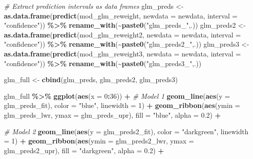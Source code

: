 \documentclass[
]{article}
\newenvironment{Shaded}{\begin{snugshade}}{\end{snugshade}}
\newcommand{\AttributeTok}[1]{\textcolor[rgb]{0.13,0.29,0.53}{#1}}
\newcommand{\CommentTok}[1]{\textcolor[rgb]{0.56,0.35,0.01}{\textit{#1}}}
\newcommand{\DecValTok}[1]{\textcolor[rgb]{0.00,0.00,0.81}{#1}}
\newcommand{\FloatTok}[1]{\textcolor[rgb]{0.00,0.00,0.81}{#1}}
\newcommand{\FunctionTok}[1]{\textcolor[rgb]{0.13,0.29,0.53}{\textbf{#1}}}
\newcommand{\NormalTok}[1]{#1}
\newcommand{\OtherTok}[1]{\textcolor[rgb]{0.56,0.35,0.01}{#1}}
\newcommand{\SpecialCharTok}[1]{\textcolor[rgb]{0.81,0.36,0.00}{\textbf{#1}}}
\newcommand{\StringTok}[1]{\textcolor[rgb]{0.31,0.60,0.02}{#1}}
\begin{document}
\begin{Shaded}
\begin{Highlighting}[]
\CommentTok{\# Extract prediction intervals as data frames}
\NormalTok{glm\_preds  }\OtherTok{\textless{}{-}} \FunctionTok{as.data.frame}\NormalTok{(}\FunctionTok{predict}\NormalTok{(mod\_glm\_reweight,  }\AttributeTok{newdata =}\NormalTok{ newdata, }\AttributeTok{interval =} \StringTok{"confidence"}\NormalTok{)) }\SpecialCharTok{\%\textgreater{}\%} \FunctionTok{rename\_with}\NormalTok{(}\SpecialCharTok{\textasciitilde{}}\FunctionTok{paste0}\NormalTok{(}\StringTok{"glm\_preds\_"}\NormalTok{,.))}
\NormalTok{glm\_preds2 }\OtherTok{\textless{}{-}} \FunctionTok{as.data.frame}\NormalTok{(}\FunctionTok{predict}\NormalTok{(mod\_glm\_reweight2, }\AttributeTok{newdata =}\NormalTok{ newdata, }\AttributeTok{interval =} \StringTok{"confidence"}\NormalTok{)) }\SpecialCharTok{\%\textgreater{}\%} \FunctionTok{rename\_with}\NormalTok{(}\SpecialCharTok{\textasciitilde{}}\FunctionTok{paste0}\NormalTok{(}\StringTok{"glm\_preds2\_"}\NormalTok{,.))}
\NormalTok{glm\_preds3 }\OtherTok{\textless{}{-}} \FunctionTok{as.data.frame}\NormalTok{(}\FunctionTok{predict}\NormalTok{(mod\_glm\_reweight3, }\AttributeTok{newdata =}\NormalTok{ newdata, }\AttributeTok{interval =} \StringTok{"confidence"}\NormalTok{)) }\SpecialCharTok{\%\textgreater{}\%} \FunctionTok{rename\_with}\NormalTok{(}\SpecialCharTok{\textasciitilde{}}\FunctionTok{paste0}\NormalTok{(}\StringTok{"glm\_preds3\_"}\NormalTok{,.))}

\NormalTok{glm\_full }\OtherTok{\textless{}{-}} \FunctionTok{cbind}\NormalTok{(glm\_preds, glm\_preds2, glm\_preds3)}

\NormalTok{glm\_full }\SpecialCharTok{\%\textgreater{}\%} 
  \FunctionTok{ggplot}\NormalTok{(}\FunctionTok{aes}\NormalTok{(}\AttributeTok{x =} \DecValTok{0}\SpecialCharTok{:}\DecValTok{36}\NormalTok{)) }\SpecialCharTok{+}
    \CommentTok{\# Model 1}
    \FunctionTok{geom\_line}\NormalTok{(}\FunctionTok{aes}\NormalTok{(}\AttributeTok{y =}\NormalTok{ glm\_preds\_fit), }\AttributeTok{color =} \StringTok{"blue"}\NormalTok{, }\AttributeTok{linewidth =} \DecValTok{1}\NormalTok{) }\SpecialCharTok{+}
    \FunctionTok{geom\_ribbon}\NormalTok{(}\FunctionTok{aes}\NormalTok{(}\AttributeTok{ymin =}\NormalTok{ glm\_preds\_lwr, }\AttributeTok{ymax =}\NormalTok{ glm\_preds\_upr), }\AttributeTok{fill =} \StringTok{"blue"}\NormalTok{, }\AttributeTok{alpha =} \FloatTok{0.2}\NormalTok{) }\SpecialCharTok{+}
  
    \CommentTok{\# Model 2}
    \FunctionTok{geom\_line}\NormalTok{(}\FunctionTok{aes}\NormalTok{(}\AttributeTok{y =}\NormalTok{ glm\_preds2\_fit), }\AttributeTok{color =} \StringTok{"darkgreen"}\NormalTok{, }\AttributeTok{linewidth =} \DecValTok{1}\NormalTok{) }\SpecialCharTok{+}
    \FunctionTok{geom\_ribbon}\NormalTok{(}\FunctionTok{aes}\NormalTok{(}\AttributeTok{ymin =}\NormalTok{ glm\_preds2\_lwr, }\AttributeTok{ymax =}\NormalTok{ glm\_preds2\_upr), }\AttributeTok{fill =} \StringTok{"darkgreen"}\NormalTok{, }\AttributeTok{alpha =} \FloatTok{0.2}\NormalTok{) }\SpecialCharTok{+}
  

\end{Highlighting}
\end{Shaded}
\end{document}
